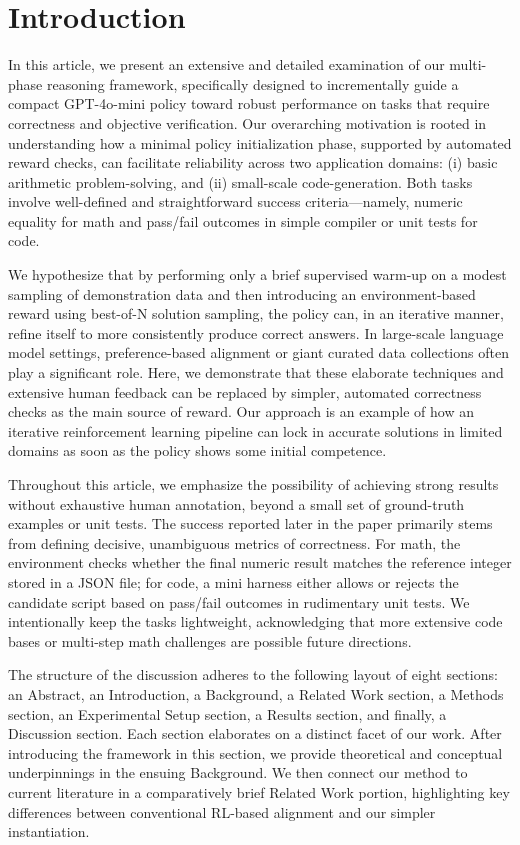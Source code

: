 \documentclass{article}
\begin{document}
\section{Introduction}
In this article, we present an extensive and detailed examination of our multi-phase reasoning framework, specifically designed to incrementally guide a compact GPT-4o-mini policy toward robust performance on tasks that require correctness and objective verification. Our overarching motivation is rooted in understanding how a minimal policy initialization phase, supported by automated reward checks, can facilitate reliability across two application domains: (i) basic arithmetic problem-solving, and (ii) small-scale code-generation. Both tasks involve well-defined and straightforward success criteria—namely, numeric equality for math and pass/fail outcomes in simple compiler or unit tests for code.

We hypothesize that by performing only a brief supervised warm-up on a modest sampling of demonstration data and then introducing an environment-based reward using best-of-N solution sampling, the policy can, in an iterative manner, refine itself to more consistently produce correct answers. In large-scale language model settings, preference-based alignment or giant curated data collections often play a significant role. Here, we demonstrate that these elaborate techniques and extensive human feedback can be replaced by simpler, automated correctness checks as the main source of reward. Our approach is an example of how an iterative reinforcement learning pipeline can lock in accurate solutions in limited domains as soon as the policy shows some initial competence.

Throughout this article, we emphasize the possibility of achieving strong results without exhaustive human annotation, beyond a small set of ground-truth examples or unit tests. The success reported later in the paper primarily stems from defining decisive, unambiguous metrics of correctness. For math, the environment checks whether the final numeric result matches the reference integer stored in a JSON file; for code, a mini harness either allows or rejects the candidate script based on pass/fail outcomes in rudimentary unit tests. We intentionally keep the tasks lightweight, acknowledging that more extensive code bases or multi-step math challenges are possible future directions.

The structure of the discussion adheres to the following layout of eight sections: an Abstract, an Introduction, a Background, a Related Work section, a Methods section, an Experimental Setup section, a Results section, and finally, a Discussion section. Each section elaborates on a distinct facet of our work. After introducing the framework in this section, we provide theoretical and conceptual underpinnings in the ensuing Background. We then connect our method to current literature in a comparatively brief Related Work portion, highlighting key differences between conventional RL-based alignment and our simpler instantiation.
\end{document}
